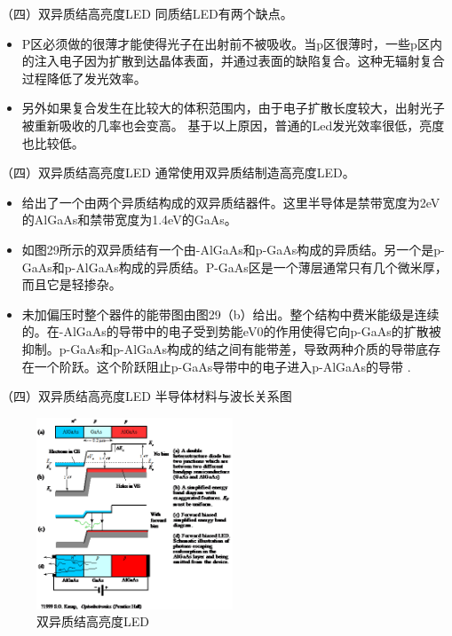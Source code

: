 \documentclass[trans]{beamer} %
\begin{document}
 
 \begin{frame}{（四）双异质结高亮度LED}
 同质结LED有两个缺点。
    \begin{itemize}
        \item  P区必须做的很薄才能使得光子在出射前不被吸收。当p区很薄时，一些p区内的注入电子因为扩散到达晶体表面，并通过表面的缺陷复合。这种无辐射复合过程降低了发光效率。
        \item  另外如果复合发生在比较大的体积范围内，由于电子扩散长度较大，出射光子被重新吸收的几率也会变高。
基于以上原因，普通的Led发光效率很低，亮度也比较低。 

    \end{itemize}
 \end{frame} 
 
 \begin{frame}{（四）双异质结高亮度LED}
  通常使用双异质结制造高亮度LED。
    \begin{itemize}
        \item 给出了一个由两个异质结构成的双异质结器件。这里半导体是禁带宽度为2eV的AlGaAs和禁带宽度为1.4eV的GaAs。
        \item 如图29所示的双异质结有一个由-AlGaAs和p-GaAs构成的异质结。另一个是p-GaAs和p-AlGaAs构成的异质结。P-GaAs区是一个薄层通常只有几个微米厚，而且它是轻掺杂。
        \item 未加偏压时整个器件的能带图由图29（b）给出。整个结构中费米能级是连续的。在-AlGaAs的导带中的电子受到势能eV0的作用使得它向p-GaAs的扩散被抑制。p-GaAs和p-AlGaAs构成的结之间有能带差，导致两种介质的导带底存在一个阶跃。这个阶跃阻止p-GaAs导带中的电子进入p-AlGaAs的导带 .

    \end{itemize}
 \end{frame} 


 \begin{frame}{（四）双异质结高亮度LED}
半导体材料与波长关系图
   
    \begin{figure}[htbp] 
    \centering\includegraphics[height=2.25in]{source/ch2/fg230.png} 
    \caption{双异质结高亮度LED}
    \end{figure}
 \end{frame}  
 
\end{document}
